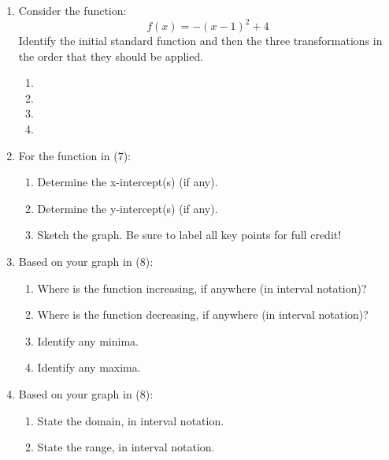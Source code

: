 \documentclass[letterpaper,12pt,fleqn]{article}
\begin{document}
\begin{enumerate}
\newpage

\item Consider the function:
\[f(x)=-(x-1)^2+4\]
Identify the initial standard function and then the three transformations in the
  order that they should be applied.
\begin{enumerate}
\item
\item
\item
\item
\end{enumerate}

\item For the function in (7):
  \begin{enumerate}
  \item Determine the x-intercept(s) (if any).

    \vspace{2in}

  \item Determine the y-intercept(s) (if any).

    \vspace{1in}

  \item Sketch the graph. Be sure to label all key points for full credit!
  \end{enumerate}

\newpage
\item Based on your graph in (8):
  \begin{enumerate}
  \item Where is the function increasing, if anywhere (in interval notation)?

    \vspace{1in}
    
  \item Where is the function decreasing, if anywhere (in interval notation)?

    \vspace{1in}

  \item Identify any minima.

    \vspace{1in}
    
  \item Identify any maxima.

    \vspace{1in}

  \end{enumerate}

\item Based on your graph in (8):
  \begin{enumerate}
  \item State the domain, in interval notation.

    \vspace{1in}
    
  \item State the range, in interval notation.
  \end{enumerate}
\end{enumerate}
\end{document}
